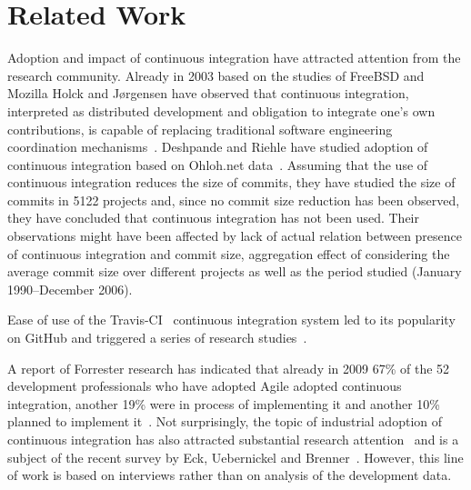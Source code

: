 \section{Related Work}
\label{sec:rw}
Adoption and impact of continuous integration have attracted  attention from the research community. Already in 2003 based on the studies of FreeBSD and Mozilla Holck and J{\o}rgensen have observed that continuous integration, interpreted as distributed development and obligation to integrate one's own contributions, is capable of replacing traditional software engineering coordination mechanisms~\cite{HolckJ03}.  
Deshpande and Riehle have studied adoption of continuous integration based on Ohloh.net data~\cite{Deshpande2008}. Assuming that the use of continuous integration reduces the size of commits, they have studied the size of commits in 5122 projects and, since no commit size reduction has been observed, they have concluded that continuous integration has not been used. Their observations might have been affected by lack of actual relation between presence of continuous integration and commit size, aggregation effect of considering the average commit size over different projects as well as the period studied (January 1990--December 2006). 

Ease of use of the Travis-CI~\cite{TravisCI} continuous integration system led to its popularity on GitHub and triggered a series of research studies~\cite{era14,VasilescuYWDF15,yue2015wait,BellerGZ16,Hilton2016,Yu2016}.

A report of Forrester research has indicated that already in 2009 67\% of the 52 development professionals who have adopted Agile adopted continuous integration, another 19\% were in process of implementing it and another 10\% planned to implement it~\cite{Forrester}. 
Not surprisingly, the topic of industrial adoption of continuous integration 
has also attracted substantial research attention~\cite{Leppanen2015,Laukkanen2015Agile,Debbiche2014,Stahl2014ICSEComp,Stahl2014JSS} and is a subject of the recent survey by Eck, Uebernickel and Brenner~\cite{EckUB14}. 
However, this line of work is based on interviews rather than on analysis of the development data.


